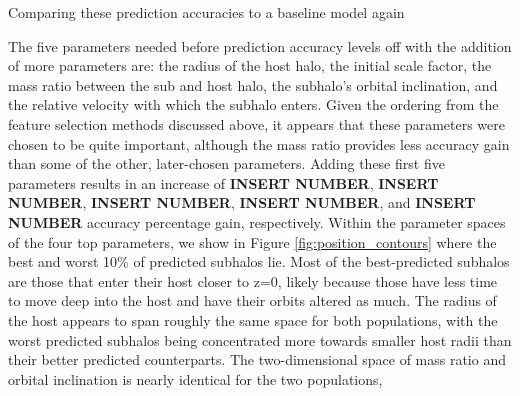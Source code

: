 \documentclass[fleqn,usenatbib]{mnras}
\newcommand\edits[1]{{\color{red}#1}}
\begin{document}
\edits{Comparing these prediction accuracies to a baseline model again 

The five parameters needed before prediction accuracy levels off with the addition of more parameters are: the radius of the host halo, the initial scale factor, the mass ratio between the sub and host halo, the subhalo's orbital inclination, and the relative velocity with which the subhalo enters. Given the ordering from the feature selection methods discussed above, it appears that these parameters were chosen to be quite important, although the mass ratio provides less accuracy gain than some of the other, later-chosen parameters. Adding these first five parameters results in an increase of \textbf{INSERT NUMBER}, \textbf{INSERT NUMBER}, \textbf{INSERT NUMBER}, \textbf{INSERT NUMBER}, and  \textbf{INSERT NUMBER} accuracy percentage gain, respectively. Within the parameter spaces of the four top parameters, we show in Figure \ref{fig:position_contours} where the best and worst 10\% of predicted subhalos lie. Most of the best-predicted subhalos are those that enter their host closer to z=0, likely because those have less time to move deep into the host and have their orbits altered as much. The radius of the host appears to span roughly the same space for both populations, with the worst predicted subhalos being concentrated more towards smaller host radii than their better predicted counterparts. The two-dimensional space of mass ratio and orbital inclination is nearly identical for the two populations,

}
\end{document}
